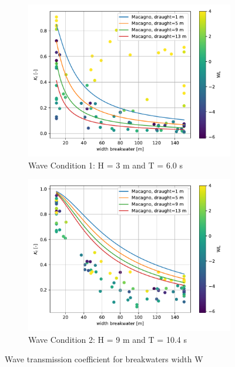 \begin{figure}[h]
    \centering
    \begin{subfigure}[b]{0.49\textwidth}
        \centering
        \includegraphics[width=\textwidth]{figures/ComFLOW/Results DI1/Kt_VS_W.pdf}
        \caption[]%
        {{\small Wave Condition 1: H = 3 m and T = 6.0 s}}    
        \label{fig: Kt vs W wave condition 1}
    \end{subfigure}
    \hfill
    \begin{subfigure}[b]{0.49\textwidth}  
        \centering 
        \includegraphics[width=\textwidth]{figures/ComFLOW/Results DI1 WC2 captive/Kt_VS_W.pdf}
        \caption[]%
        {{\small Wave Condition 2: H = 9 m and T = 10.4 s}}    
        \label{fig: Kt vs W wave condition 2}
    \end{subfigure}
  
    \caption{Wave transmission coefficient for breakwaters width W}
    \label{fig: Kt versus floater width for both wave conditions}
\end{figure}




